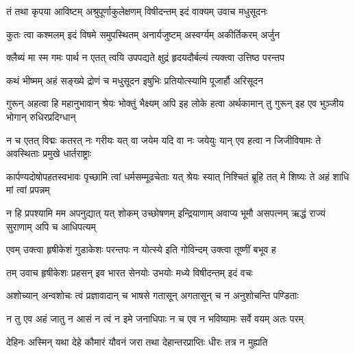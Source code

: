 

\twolineshloka
{तं तथा कृपया आविष्टम् अश्रुपूर्णाकुलेक्षणम्}
{विषीदन्तम् इदं वाक्यम् उवाच मधुसूदनः}%


\twolineshloka
{कुतः त्वा कश्मलम् इदं विषमे समुपस्थितम्}
{अनार्यजुष्टम् अस्वर्ग्यम् अकीर्तिकरम् अर्जुन}%

\twolineshloka
{क्लैब्यं मा स्म गमः पार्थ न एतत् त्वयि उपपद्यते}
{क्षुद्रं हृदयदौर्बल्यं त्यक्त्वा उत्तिष्ठ परन्तप}%


\twolineshloka
{कथं भीष्मम् अहं सङ्ख्ये द्रोणं च मधुसूदन}
{इषुभिः प्रतियोत्स्यामि पूजार्हौ अरिसूदन}%

\fourlineindentedshloka
{गुरून् अहत्वा हि महानुभावान्}
{श्रेयः भोक्तुं भैक्ष्यम् अपि इह लोके}
{हत्वा अर्थकामान् तु गुरून् इह एव}
{भुञ्जीय भोगान् रुधिरप्रदिग्धान्}%

\fourlineindentedshloka
{न च एतत् विद्मः कतरत् नः गरीयः}
{यत् वा जयेम यदि वा नः जयेयुः}
{यान् एव हत्वा न जिजीविषामः}
{ते अवस्थिताः प्रमुखे धार्तराष्ट्राः}%

\fourlineindentedshloka
{कार्पण्यदोषोपहतस्वभावः}
{पृच्छामि त्वां धर्मसम्मूढचेताः}
{यत् श्रेयः स्यात् निश्चितं ब्रूहि तत् मे}
{शिष्यः ते अहं शाधि मां त्वां प्रपन्नम्}%

\fourlineindentedshloka
{न हि प्रपश्यामि मम अपनुद्यात्}
{यत् शोकम् उच्छोषणम् इन्द्रियाणाम्}
{अवाप्य भूमौ असपत्नम् ऋद्धं}
{राज्यं सुराणाम् अपि च आधिपत्यम्}%


\twolineshloka
{एवम् उक्त्वा हृषीकेशं गुडाकेशः परन्तपः}
{न योत्स्ये इति गोविन्दम् उक्त्वा तूष्णीं बभूव ह}%

\twolineshloka
{तम् उवाच हृषीकेशः प्रहसन् इव भारत}
{सेनयोः उभयोः मध्ये विषीदन्तम् इदं वचः}%


\twolineshloka
{अशोच्यान् अन्वशोचः त्वं प्रज्ञावादान् च भाषसे}
{गतासून् अगतासून् च न अनुशोचन्ति पण्डिताः}%

\twolineshloka
{न तु एव अहं जातु न आसं न त्वं न इमे जनाधिपाः}
{न च एव न भविष्यामः सर्वे वयम् अतः परम्}%

\twolineshloka
{देहिनः अस्मिन् यथा देहे कौमारं यौवनं जरा}
{तथा देहान्तरप्राप्तिः धीरः तत्र न मुह्यति}%

